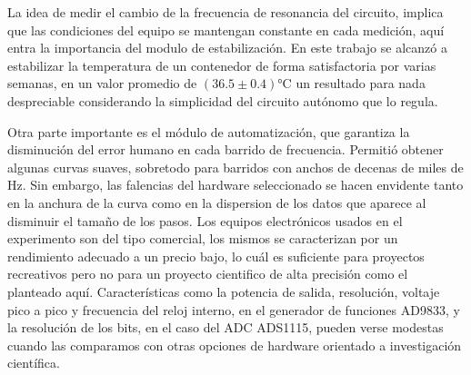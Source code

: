 La idea de medir el cambio de la frecuencia de resonancia del circuito, implica que las condiciones del equipo se mantengan constante en cada medición, aquí entra la importancia del modulo de estabilización. En este trabajo se alcanzó a estabilizar la temperatura de un contenedor de forma satisfactoria por varias semanas, en un valor promedio de  $(36.5 \pm 0.4)$°C  un resultado para nada despreciable considerando la simplicidad del circuito autónomo que lo regula.
 
Otra parte importante es el módulo de automatización, que garantiza la disminución del error humano en cada barrido de frecuencia. Permitió obtener algunas curvas suaves, sobretodo para barridos con anchos de decenas de miles de Hz.  Sin embargo, las falencias del hardware seleccionado se hacen envidente tanto en la anchura de la curva como en la dispersion de los datos que aparece al disminuir el tamaño de los pasos. Los equipos electrónicos usados en el experimento son del tipo comercial, los mismos se caracterizan por un rendimiento adecuado a un precio bajo, lo cuál es suficiente para proyectos recreativos pero no para un proyecto cientifico de alta precisión como el planteado aquí. Características como la potencia de salida, resolución, voltaje pico a pico y frecuencia del reloj interno, en el generador de funciones AD9833, y la resolución de los bits, en el caso del ADC ADS1115, pueden verse modestas cuando las comparamos con otras opciones de hardware orientado a investigación científica.


